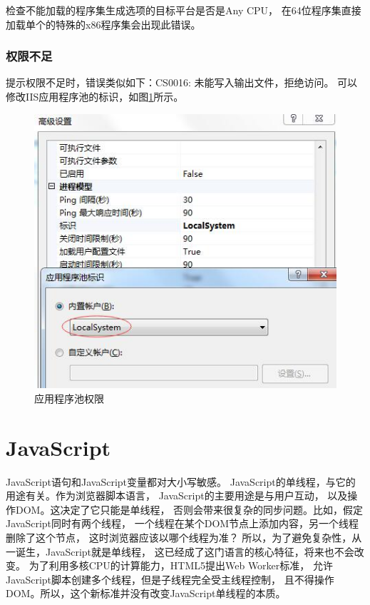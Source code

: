\documentclass{book}
\begin{document}
检查不能加载的程序集生成选项的目标平台是否是Any CPU，
在64位程序集直接加载单个的特殊的x86程序集会出现此错误。

\subsection{权限不足}

提示权限不足时，错误类似如下：CS0016: 未能写入输出文件，拒绝访问。
可以修改IIS应用程序池的标识，如图\ref{fig:ApplicationPoolIdentify}所示。

\begin{figure}[htbp]
	\centering
	\includegraphics[scale=0.5]{ApplicationPoolIdentify.jpg}
	\caption{应用程序池权限}
	\label{fig:ApplicationPoolIdentify}
\end{figure}

\chapter{JavaScript}

\clearpage
\mbox{}         
\clearpage

JavaScript语句和JavaScript变量都对大小写敏感。
JavaScript的单线程，与它的用途有关。作为浏览器脚本语言，
JavaScript的主要用途是与用户互动，
以及操作DOM。这决定了它只能是单线程，
否则会带来很复杂的同步问题。比如，假定JavaScript同时有两个线程，
一个线程在某个DOM节点上添加内容，另一个线程删除了这个节点，
这时浏览器应该以哪个线程为准？
所以，为了避免复杂性，从一诞生，JavaScript就是单线程，
这已经成了这门语言的核心特征，将来也不会改变。
为了利用多核CPU的计算能力，HTML5提出Web Worker标准，
允许JavaScript脚本创建多个线程，但是子线程完全受主线程控制，
且不得操作DOM。所以，这个新标准并没有改变JavaScript单线程的本质。
\end{document}
